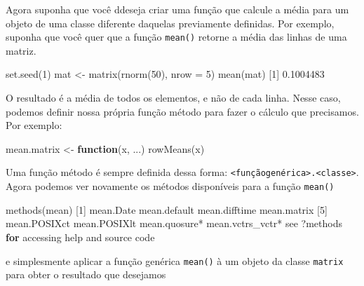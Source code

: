 \documentclass[
  10pt,
  a4paper]{book}
\newenvironment{Shaded}{\begin{snugshade}}{\end{snugshade}}
\newcommand{\AttributeTok}[1]{\textcolor[rgb]{0.77,0.63,0.00}{#1}}
\newcommand{\ControlFlowTok}[1]{\textcolor[rgb]{0.13,0.29,0.53}{\textbf{#1}}}
\newcommand{\DecValTok}[1]{\textcolor[rgb]{0.00,0.00,0.81}{#1}}
\newcommand{\FloatTok}[1]{\textcolor[rgb]{0.00,0.00,0.81}{#1}}
\newcommand{\FunctionTok}[1]{\textcolor[rgb]{0.00,0.00,0.00}{#1}}
\newcommand{\NormalTok}[1]{#1}
\newcommand{\OtherTok}[1]{\textcolor[rgb]{0.56,0.35,0.01}{#1}}
\newcommand{\SpecialCharTok}[1]{\textcolor[rgb]{0.00,0.00,0.00}{#1}}
\newcommand{\StringTok}[1]{\textcolor[rgb]{0.31,0.60,0.02}{#1}}
\begin{document}
Agora suponha que você ddeseja criar uma função que calcule a média para
um objeto de uma classe diferente daquelas previamente definidas. Por
exemplo, suponha que você quer que a função \texttt{mean()} retorne a média das
linhas de uma matriz.

\begin{Shaded}
\begin{Highlighting}[]
\FunctionTok{set.seed}\NormalTok{(}\DecValTok{1}\NormalTok{)}
\NormalTok{mat }\OtherTok{\textless{}{-}} \FunctionTok{matrix}\NormalTok{(}\FunctionTok{rnorm}\NormalTok{(}\DecValTok{50}\NormalTok{), }\AttributeTok{nrow =} \DecValTok{5}\NormalTok{)}
\FunctionTok{mean}\NormalTok{(mat)}
\NormalTok{[}\DecValTok{1}\NormalTok{] }\FloatTok{0.1004483}
\end{Highlighting}
\end{Shaded}

O resultado é a média de todos os elementos, e não de cada linha. Nesse
caso, podemos definir nossa própria função método para fazer o cálculo
que precisamos. Por exemplo:

\begin{Shaded}
\begin{Highlighting}[]
\NormalTok{mean.matrix }\OtherTok{\textless{}{-}} \ControlFlowTok{function}\NormalTok{(x, ...) }\FunctionTok{rowMeans}\NormalTok{(x)}
\end{Highlighting}
\end{Shaded}

Uma função método é sempre definida dessa forma:
\texttt{\textless{}funçãogenérica\textgreater{}.\textless{}classe\textgreater{}}. Agora podemos ver novamente os métodos
disponíveis para a função \texttt{mean()}

\begin{Shaded}
\begin{Highlighting}[]
\FunctionTok{methods}\NormalTok{(mean)}
\NormalTok{[}\DecValTok{1}\NormalTok{] mean.Date        mean.default     mean.difftime    mean.matrix     }
\NormalTok{[}\DecValTok{5}\NormalTok{] mean.POSIXct     mean.POSIXlt     mean.quosure}\SpecialCharTok{*}\NormalTok{    mean.vctrs\_vctr}\SpecialCharTok{*}
\NormalTok{see }\StringTok{\textquotesingle{}?methods\textquotesingle{}} \ControlFlowTok{for}\NormalTok{ accessing help and source code}
\end{Highlighting}
\end{Shaded}

e simplesmente aplicar a função genérica \texttt{mean()} à um objeto da classe
\texttt{matrix} para obter o resultado que desejamos
\end{document}
